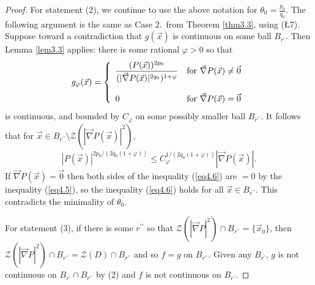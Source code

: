 \documentclass[10pt,a4paper]{amsart}
\newcommand{\vv}{\mathcal{Z}}
\begin{document}
\begin{proof}
For statement (2), we continue to use the above notation for $\displaystyle{\theta_0=\frac{p_0}{q_0}}$.  The following argument is the same as Case 2.\ from Theorem \ref{thm3.3}, using (\L7).  Suppose toward a contradiction that $g(\vec x)$ is continuous on some ball $B_{r^{\prime}}$.  Then Lemma \ref{lem3.3} applies: there is some rational $\varphi>0$ so that 
$$g_{\varphi}(\vec x)=\left\{\begin{array}{ll}{\displaystyle{\frac{(P(\vec x))^{2p_0}}{(|\vec\nabla P(\vec x)|^{2q_0})^{1+\varphi}}}} & \mbox{\rm{for} $\vec\nabla P(\vec x)\ne\vec0$}\\ & \\0& \mbox{\rm{for} $\vec\nabla P(\vec x)=\vec0$} \end{array}\right.$$
is continuous, and bounded by $C_\varphi$ on some possibly smaller ball $B_{r^{\prime\prime}}$.
It follows that for $\vec x\in B_{r^{\prime\prime}}\setminus\vv(|\vec\nabla P(\vec x)|^2)$, 
\begin{equation}\label{eq4.6}
|P(\vec x)|^{2p_0/(2q_0(1+\varphi))}\le C_\varphi^{1/(2q_0(1+\varphi))}|\vec\nabla P(\vec x)|.
\end{equation}
If $\vec\nabla P(\vec x)=\vec0$ then both sides of the inequality (\ref{eq4.6}) are $=0$ by the inequality (\ref{eq4.5}), so the inequality (\ref{eq4.6}) holds for all $\vec x\in B_{r^{\prime\prime}}$.  This contradicts the minimality of $\theta_0$.

For statement (3), if there is some $r^{\prime\prime}$ so that $\vv(|\vec\nabla P|^2)\cap B_{r^{\prime\prime}}=\{\vec x_0\}$, then $\vv(|\vec\nabla P|^2)\cap B_{r^{\prime\prime}}=\vv(D)\cap B_{r^{\prime\prime}}$ and so $f=g$ on $B_{r^{\prime\prime}}$.  Given any $B_{r^\prime}$, $g$ is not continuous on $B_{r^\prime}\cap B_{r^{\prime\prime}}$ by (2) and $f$ is not continuous on $B_{r^\prime}$. 
%
%    
\end{proof}
\end{document}
